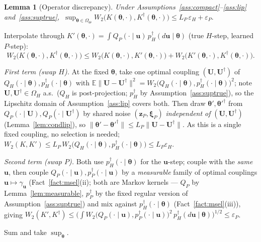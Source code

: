 \documentclass[11pt]{article}
\makeatletter
\theoremstyle{definitionbreak}
\theoremstyle{plainbreak}
\newtheorem{lemma}[theorem]{Lemma}
\theoremstyle{remarkbreak}
\renewenvironment{proof}[1][\proofname]{\par
  \pushQED{\qed}\normalfont
  \topsep6\p@\@plus6\p@\relax
  \trivlist
  \item[\hskip\labelsep\itshape #1\@addpunct{.}]\mbox{}\par\nobreak\ignorespaces
}{\popQED\endtrivlist\@endpefalse}
\newcommand{\E}{\mathbb{E}}
\newcommand{\Om}{\Omega}
\newcommand{\bth}{\bm{\theta}}
\newcommand{\norm}[1]{\lVert #1 \rVert}
\makeatother
\begin{document}
\begin{lemma}[Operator discrepancy]
\label{lem:opdisc}
Under Assumptions~\ref{ass:compact}--\ref{ass:lip} and~\ref{ass:suptrue},
$\ \sup_{\bth\in\Om_\Theta} W_2\big(K(\bth,\cdot),K^\dagger(\bth,\cdot)\big)\le L_P\,\varepsilon_H+\varepsilon_P.$
\end{lemma}
\begin{proof}
Interpolate through $K'(\bth,\cdot)=\int Q_P(\cdot\mid\bm u)\,p^\dagger_H(d\bm u\mid\bth)$ (true
$H$-step, learned $P$-step):
\[
  W_2\big(K(\bth,\cdot),K^\dagger(\bth,\cdot)\big)\le W_2\big(K(\bth,\cdot),K'(\bth,\cdot)\big)+W_2\big(K'(\bth,\cdot),K^\dagger(\bth,\cdot)\big).
\]

\emph{First term (swap $H$).} At the fixed $\bth$, take one optimal coupling $(\bm U,\bm U^\dagger)$
of $Q_H(\cdot\mid\bth),p^\dagger_H(\cdot\mid\bth)$ with
$\E\norm{\bm U-\bm U^\dagger}^2=W_2\big(Q_H(\cdot\mid\bth),p^\dagger_H(\cdot\mid\bth)\big)^2$; note
$\bm U,\bm U^\dagger\in\Om_H$ a.s.\ ($Q_H$ is post-projection; $p^\dagger_H$ by
Assumption~\ref{ass:suptrue}), so the Lipschitz domain of Assumption~\ref{ass:lip} covers both. Then
draw $\bth',\bth'^\dagger$ from $Q_P(\cdot\mid\bm U),Q_P(\cdot\mid\bm U^\dagger)$ by shared noise
$(\bm z_P,\bm\xi_P)$ \emph{independent of} $(\bm U,\bm U^\dagger)$ (Lemma~\ref{lem:condlip}), so
$\norm{\bth'-\bth'^\dagger}\le L_P\norm{\bm U-\bm U^\dagger}$. As this is a single fixed coupling, no
selection is needed;
$W_2(K,K')\le L_P\,W_2\big(Q_H(\cdot\mid\bth),p^\dagger_H(\cdot\mid\bth)\big)\le L_P\varepsilon_H$.

\emph{Second term (swap $P$).} Both use $p^\dagger_H(\cdot\mid\bth)$ for the $\bm u$-step; couple with
the \emph{same} $\bm u$, then couple $Q_P(\cdot\mid\bm u),p^\dagger_P(\cdot\mid\bm u)$ by a
\emph{measurable} family of optimal couplings $\bm u\mapsto\gamma_{\bm u}$
(Fact~\ref{fact:msel}(ii); both are Markov kernels --- $Q_P$ by Lemma~\ref{lem:measurable},
$p^\dagger_P$ by the fixed regular version of Assumption~\ref{ass:suptrue}) and mix against
$p^\dagger_H(\cdot\mid\bth)$ (Fact~\ref{fact:msel}(iii)), giving
$W_2(K',K^\dagger)\le\big(\int W_2\big(Q_P(\cdot\mid\bm u),p^\dagger_P(\cdot\mid\bm u)\big)^2\,p^\dagger_H(d\bm u\mid\bth)\big)^{1/2}\le\varepsilon_P$.

Sum and take $\sup_{\bth}$.
\end{proof}
\end{document}
